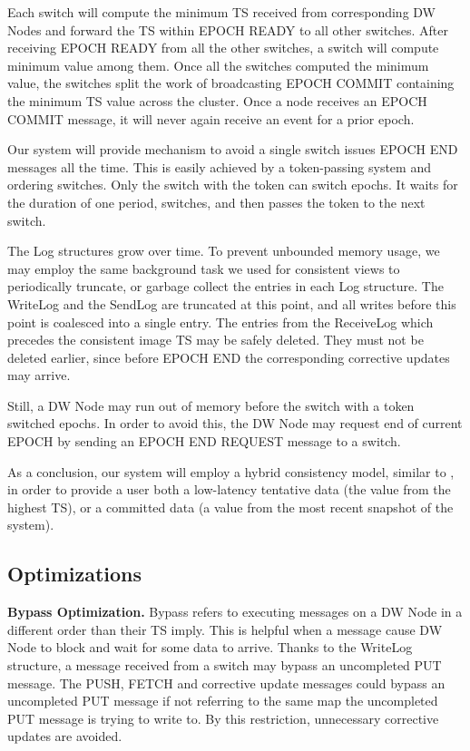 \documentclass{sig-semester}
\begin{document}
Each switch will compute the minimum TS received from corresponding DW Nodes and forward the TS within EPOCH READY to all other switches. After receiving EPOCH READY from all the other switches, a switch will compute minimum value among them. Once all the switches computed the minimum value, the switches split the work of broadcasting EPOCH COMMIT containing the minimum TS value across the cluster. Once a node receives an EPOCH COMMIT message, it will never again receive an event for a prior epoch.

Our system will provide mechanism to avoid a single switch issues EPOCH END messages all the time. This is easily achieved by a token-passing system and ordering switches. Only the switch with the token can switch epochs. It waits for the duration of one period, switches, and then passes the token to the next switch.

The Log structures grow over time. To prevent unbounded memory usage, we may employ the same background task we used for consistent views to periodically truncate, or garbage collect the entries in each Log structure. The WriteLog and the SendLog are truncated at this point, and all writes before this point is coalesced into a single entry. The entries from the ReceiveLog which precedes the consistent image TS may be safely deleted. They must not be deleted earlier, since before EPOCH END the corresponding corrective updates may arrive.

Still, a DW Node may run out of memory before the switch with a token switched epochs. In order to avoid this, the DW Node may request end of current EPOCH by sending an EPOCH END REQUEST message to a switch.

As a conclusion, our system will employ a hybrid consistency model, similar to \cite{Bayou95}, in order to provide a user both a low-latency tentative data (the value from the highest TS), or a committed data (a value from the most recent snapshot of the system).

\subsection{Optimizations}
\textbf{Bypass Optimization.} Bypass refers to executing messages on a DW Node in a different order than their TS imply. This is helpful when a message cause DW Node to block and wait for some data to arrive. Thanks to the WriteLog structure, a message received from a switch may bypass an uncompleted PUT message. The PUSH, FETCH and corrective update messages could bypass an uncompleted PUT message if not referring to the same map the uncompleted PUT message is trying to write to. By this restriction, unnecessary corrective updates are avoided.
\end{document}
